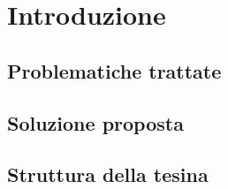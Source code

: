 \chapter{Introduzione}

\begin{citazione}
\end{citazione}
\newpage

\section{Problematiche trattate} %
\section{Soluzione proposta} %
\section{Struttura della tesina} 
